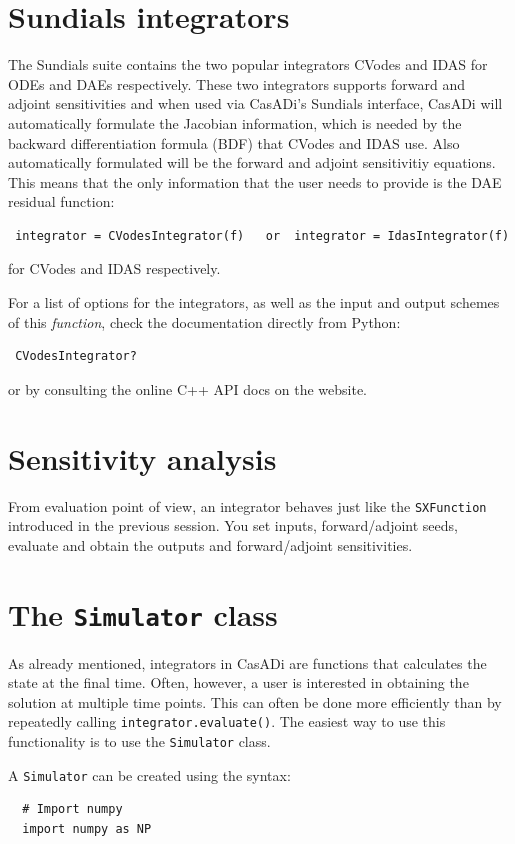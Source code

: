 \documentclass[a4paper,12pt]{book}
\begin{document}
{\section{Sundials integrators}
The Sundials suite contains the two popular integrators CVodes and IDAS for ODEs and DAEs respectively. These two integrators supports forward and adjoint sensitivities and when used via CasADi's Sundials interface, CasADi will automatically formulate the Jacobian information, which is needed by the backward differentiation formula (BDF) that CVodes and IDAS use. Also automatically formulated will be the forward and adjoint sensitivitiy equations. This means that the only information that the user needs to provide is the DAE residual function:
\begin{verbatim}
 integrator = CVodesIntegrator(f)   or  integrator = IdasIntegrator(f)
\end{verbatim}
for CVodes and IDAS respectively.

For a list of options for the integrators, as well as the input and output schemes of this \emph{function}, check the documentation directly from Python:
\begin{verbatim}
 CVodesIntegrator?
\end{verbatim}
or by consulting the online C++ API docs on the website.

\section{Sensitivity analysis}
From evaluation point of view, an integrator behaves just like the \texttt{SXFunction} introduced in the previous session. You set inputs, forward/adjoint seeds, evaluate and obtain the outputs and forward/adjoint sensitivities.

\section{The \texttt{Simulator} class}
As already mentioned, integrators in CasADi are functions that calculates the state at the final time. Often, however, a user is interested in obtaining the solution at multiple time points. This can often be done more efficiently than by repeatedly calling \texttt{integrator.evaluate()}. The easiest way to use this functionality is to use the \texttt{Simulator} class.

A \texttt{Simulator} can be created using the syntax:
\begin{verbatim}
  # Import numpy
  import numpy as NP


\end{verbatim}}
\end{document}
